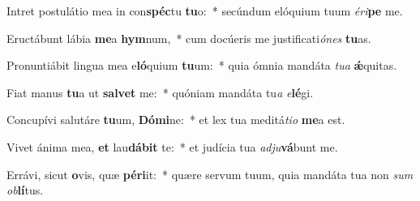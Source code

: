 \item Intret postulátio mea in con\textbf{spéc}tu \textbf{tu}o:~* secúndum elóquium tuum \textit{é}\textit{ri}\textbf{pe} me.
\item Eructábunt lábia \textbf{me}a \textbf{hym}num,~* cum docúeris me justificati\textit{ó}\textit{nes} \textbf{tu}as.
\item Pronuntiábit lingua mea e\textbf{ló}quium \textbf{tu}um:~* quia ómnia mandáta \textit{tu}\textit{a} \textbf{ǽ}quitas.
\item Fiat manus \textbf{tu}a ut \textbf{sal}\textbf{vet} me:~* quóniam mandáta tu\textit{a} \textit{e}\textbf{lé}gi.
\item Concupívi salutáre \textbf{tu}um, \textbf{Dó}\textbf{mi}ne:~* et lex tua meditá\textit{ti}\textit{o} \textbf{me}a est.
\item Vivet ánima mea, \textbf{et} lau\textbf{dá}\textbf{bit} te:~* et judícia tua \textit{ad}\textit{ju}\textbf{vá}bunt me.
\item Errávi, sicut \textbf{o}vis, quæ \textbf{pér}\textbf{i}it:~* quære servum tuum, quia mandáta tua non \textit{sum} \textit{ob}\textbf{lí}tus.
